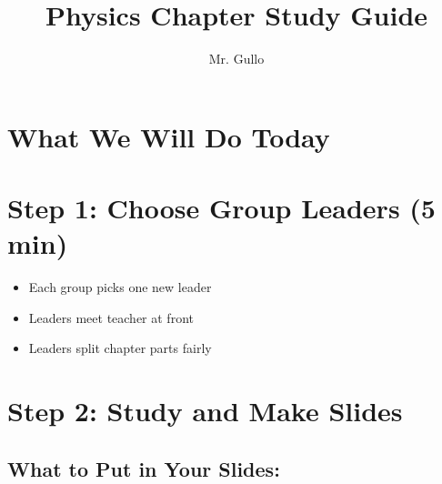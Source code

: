 \documentclass[12pt]{article}
\begin{document}
\title{\Large Physics Chapter Study Guide}
\author{Mr. Gullo}
\date{}

\maketitle

\section*{What We Will Do Today}
\begin{center}
\end{center}

\section*{Step 1: Choose Group Leaders (5 min)}
\begin{itemize}[leftmargin=*]
    \item Each group picks one new leader
    \item Leaders meet teacher at front
    \item Leaders split chapter parts fairly
\end{itemize}

\section*{Step 2: Study and Make Slides }

\subsection*{What to Put in Your Slides:}
\begin{center}
\end{center}
\end{document}
